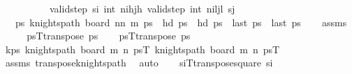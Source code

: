 \begin{isabellebody}
\ \ \ \ \ \ \ \ \ \ {\isachardoublequoteopen}valid{\isacharunderscore}{\kern0pt}step\ s\isactrlsub i\ {\isacharparenleft}{\kern0pt}int\ ni\isactrlsub h{\isacharcomma}{\kern0pt}j\isactrlsub h{\isacharparenright}{\kern0pt}{\isachardoublequoteclose}\ {\isachardoublequoteopen}valid{\isacharunderscore}{\kern0pt}step\ {\isacharparenleft}{\kern0pt}int\ ni\isactrlsub l{\isacharcomma}{\kern0pt}j\isactrlsub l{\isacharparenright}{\kern0pt}\ s\isactrlsub j{\isachardoublequoteclose}\isanewline
\ \ \ {\isachardoublequoteopen}{\isasymexists}ps{\isachardot}{\kern0pt}\ knights{\isacharunderscore}{\kern0pt}path\ {\isacharparenleft}{\kern0pt}board\ {\isacharparenleft}{\kern0pt}nn\ m{\isacharparenright}{\kern0pt}\ ps\ {\isasymand}\ hd\ ps\ {\isacharequal}{\kern0pt}\ hd\ ps\ {\isasymand}\ last\ ps\ {\isacharequal}{\kern0pt}\ last\ ps\isanewline
%
\isadelimproof
\ \ %
\endisadelimproof
%
\isatagproof
{}\isamarkupfalse%
\ assms\isanewline
{}\isamarkupfalse%
\ {\isacharminus}{\kern0pt}\isanewline
\ \ \isamarkupfalse%
\ {\isacharquery}{\kern0pt}psT{\isacharequal}{\kern0pt}{\isachardoublequoteopen}transpose\ ps\isanewline
\ \ \isamarkupfalse%
\ {\isacharquery}{\kern0pt}psT{\isacharequal}{\kern0pt}{\isachardoublequoteopen}transpose\ ps\isanewline
\ \ \isamarkupfalse%
\ kps{\isacharcolon}{\kern0pt}\ {\isachardoublequoteopen}knights{\isacharunderscore}{\kern0pt}path\ {\isacharparenleft}{\kern0pt}board\ m\ n\ {\isacharquery}{\kern0pt}psT{\isachardoublequoteclose}\ {\isachardoublequoteopen}knights{\isacharunderscore}{\kern0pt}path\ {\isacharparenleft}{\kern0pt}board\ m\ n\ {\isacharquery}{\kern0pt}psT{\isachardoublequoteclose}\isanewline
\ \ \ \ \isamarkupfalse%
\ assms\ transpose{\isacharunderscore}{\kern0pt}knights{\isacharunderscore}{\kern0pt}path\ \isamarkupfalse%
\ auto\isanewline
\isanewline
\ \ \isamarkupfalse%
\ {\isacharquery}{\kern0pt}s\isactrlsub iT{\isacharequal}{\kern0pt}{\isachardoublequoteopen}transpose{\isacharunderscore}{\kern0pt}square\ s\isactrlsub i{\isachardoublequoteclose}\isanewline

\end{isabellebody}
